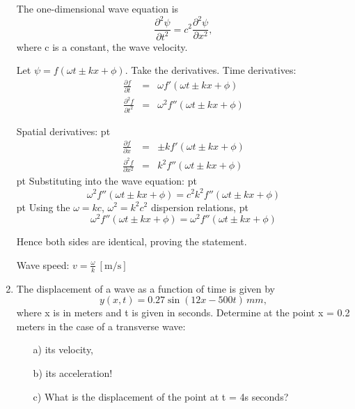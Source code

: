 \documentclass[t,aspectratio=169]{beamer}
\begin{document}
\begin{frame}
\begin{enumerate}
The one-dimensional wave equation is
$$\frac{\partial^{2}\psi}{\partial t^2}=c^2\frac{\partial^{2}\psi}{\partial x^{2}},$$
where c  is a constant, the wave velocity.

Let $\psi=f(\omega t\pm kx+\phi)$. Take the derivatives. Time derivatives:
\begin{eqnarray*}
\frac{\partial f}{\partial t}&=&\omega f'(\omega t\pm kx+\phi)\\
\frac{\partial^{2}f}{\partial t^2}&=&\omega^2 f''(\omega t\pm kx+\phi)
\end{eqnarray*}

\pagebreak
Spatial derivatives:
 pt
\begin{eqnarray*}
\frac{\partial f}{\partial x}&=&\pm k f'(\omega t\pm kx+\phi) \\
\frac{\partial^{2}f}{\partial x^2}&=&k^2 f''(\omega t\pm kx+\phi)
\end{eqnarray*}
  pt 
 Substituting into the wave equation:
  pt
$$\omega^2 f''(\omega t\pm kx+\phi)=c^2 k^2 f''(\omega t\pm kx+\phi)$$
 pt
Using the $\omega=kc$, $\omega^2=k^2c^2$ dispersion relations,
 pt
$$\omega^2 f''(\omega t\pm kx+\phi)=\omega^2 f''(\omega t\pm kx+\phi)$$

Hence both sides are identical, proving the statement.

Wave speed: $v = \frac{\omega}{k}\ \mathrm{[m/s]}$  

\pagebreak

\item The displacement of a wave as a function of time is given by $$y(x,t) = 0.27 \sin(12x - 500t)\,mm,$$ where x is in meters and t is given in seconds. Determine at the point x = 0.2 meters in the case of a transverse wave:
\begin{enumerate}
\item[a)] its velocity,
\item[b)] its acceleration!
\item[c)] What is the displacement of the point at t = 4s seconds?
\end{enumerate}


\begin{center}
\end{center}
\end{enumerate}
\end{frame}
\end{document}
